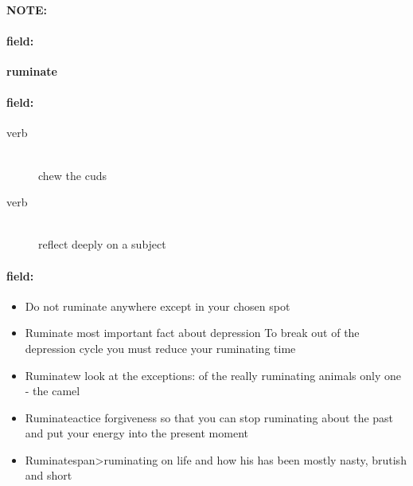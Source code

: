 \documentclass[12pt]{article}
\newenvironment{note}{\paragraph{NOTE:}}{}
\newenvironment{field}{\paragraph{field:}}{}
\begin{document}
\begin{note}
\begin{field}
\textbf{\large ruminate}
\end{field}


\begin{field}
\begin{description}
\item[verb] \hfill \\ 
chew the cuds

\item[verb] \hfill \\ 
reflect deeply on a subject

\end{description}
\end{field}

\begin{field}
\begin{itemize}
\item Do not ruminate anywhere except in your chosen spot
\item Ruminate most important fact about depression To break out of the depression cycle you must reduce your ruminating time
\item Ruminatew look at the exceptions: of the really ruminating animals only one - the camel
\item Ruminateactice forgiveness so that you can stop ruminating about the past and put your energy into the present moment
\item Ruminatespan>ruminating on life and how his has been mostly nasty, brutish and short
\end{itemize}
\end{field}
\end{note}
\end{document}
